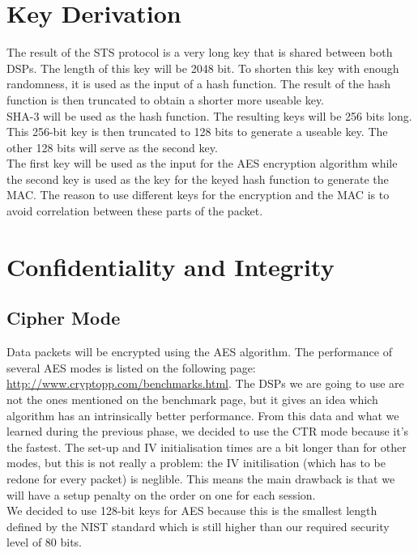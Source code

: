 \documentclass[a4paper]{article}
\begin{document}
\section{Key Derivation}
\label{sec:key_derivation}

The result of the STS protocol is a very long key that is shared between both DSPs. The length of this key will be 2048 bit. To shorten this key with enough randomness, it is used as the input of a hash function. The result of the hash function is then truncated to obtain a shorter more useable key.\\

SHA-3 will be used as the hash function. The resulting keys will be 256 bits long. This 256-bit key is then truncated to 128 bits to generate a useable key. The other 128 bits will serve as the second key.\\

The first key will be used as the input for the AES encryption algorithm while the second key is used as the key for the keyed hash function to generate the MAC. The reason to use different keys for the encryption and the MAC is to avoid correlation between these parts of the packet.

\section{Confidentiality and Integrity}

\subsection{Cipher Mode}

Data packets will be encrypted using the AES algorithm. The performance of several AES modes is listed on the following page: \url{http://www.cryptopp.com/benchmarks.html}. The DSPs we are going to use are not the ones mentioned on the benchmark page, but it gives an idea which algorithm has an intrinsically better performance. From this data and what we learned during the previous phase, we decided to use the CTR mode because it's the fastest. The set-up and IV initialisation times are a bit longer than for other modes, but this is not really a problem: the IV initilisation (which has to be redone for every packet) is neglible. This means the main drawback is that we will have a setup penalty on the order on one {\micro\second} for each session.\\

We decided to use 128-bit keys for AES because this is the smallest length defined by the NIST standard which is still higher than our required security level of 80 bits.
\end{document}
